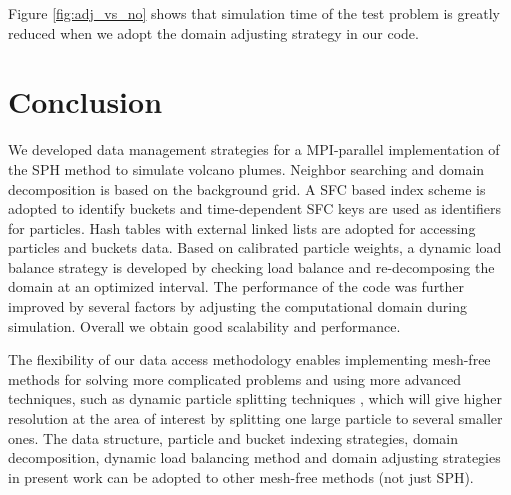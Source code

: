 Figure \ref{fig:adj_vs_no} shows that simulation time of the test problem is greatly reduced when we adopt the domain adjusting strategy in our code.

\section{Conclusion}
We developed data management strategies for a MPI-parallel implementation of the SPH method to simulate volcano plumes. Neighbor searching and domain decomposition is based on the background grid. A SFC based index scheme is adopted to identify buckets and time-dependent SFC keys are used as identifiers for particles. 
Hash tables with external linked lists are adopted for accessing particles and buckets data. Based on calibrated particle weights, a dynamic load balance strategy is developed by checking load balance and re-decomposing the domain at an optimized interval. The performance of the code was further improved by several factors by adjusting the computational domain during simulation.
Overall we obtain good scalability and performance.

The flexibility of our data access methodology enables implementing mesh-free methods for solving more complicated problems and using more advanced techniques, such as dynamic particle splitting techniques \citep{vacondio2012accurate, feldman2007dynamic}, which will give higher resolution at the area of interest by splitting one large particle to several smaller ones. The data structure, particle and bucket indexing strategies, domain decomposition, dynamic load balancing method and domain adjusting strategies in present work can be adopted to other mesh-free methods (not just SPH).
